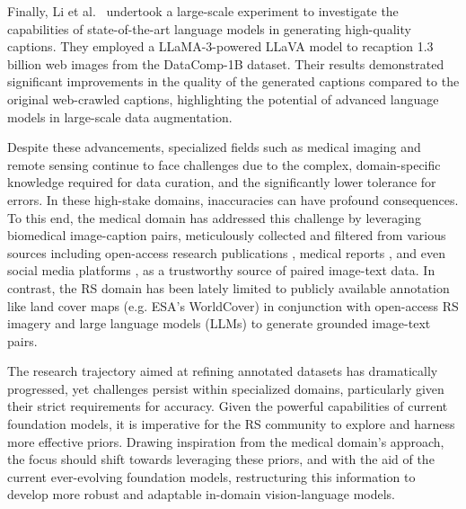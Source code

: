 Finally, Li et al.~\cite{li2024if} undertook a large-scale experiment to investigate the capabilities of state-of-the-art language models in generating high-quality captions. They employed a LLaMA-3-powered LLaVA model to recaption 1.3 billion web images from the DataComp-1B dataset. Their results demonstrated significant improvements in the quality of the generated captions compared to the original web-crawled captions, highlighting the potential of advanced language models in large-scale data augmentation.

Despite these advancements, specialized fields such as medical imaging and remote sensing continue to face challenges due to the complex, domain-specific knowledge required for data curation, and the significantly lower tolerance for errors. In these high-stake domains, inaccuracies can have profound consequences. To this end, the medical domain has addressed this challenge by leveraging biomedical image-caption pairs, meticulously collected and filtered from various sources including open-access research publications \cite{pelka2018radiology, subramanian2020medicat, lin2023pmc, liu2023qilin}, medical reports \cite{johnson2019mimic, bustos2020padchest, li2021ffa}, and even social media platforms \cite{huang2023visual, ikezogwo2023quilt}, as a trustworthy source of paired image-text data. In contrast, the RS domain has been lately limited to publicly available annotation like land cover maps (e.g. ESA's WorldCover) in conjunction with open-access RS imagery and large language models (LLMs) to generate grounded image-text pairs.

The research trajectory aimed at refining annotated datasets has dramatically progressed, yet challenges persist within specialized domains, particularly given their strict requirements for accuracy. Given the powerful capabilities of current foundation models, it is imperative for the RS community to explore and harness more effective priors. Drawing inspiration from the medical domain's approach, the focus should shift towards leveraging these priors, and with the aid of the current ever-evolving foundation models, restructuring this information to develop more robust and adaptable in-domain vision-language models.